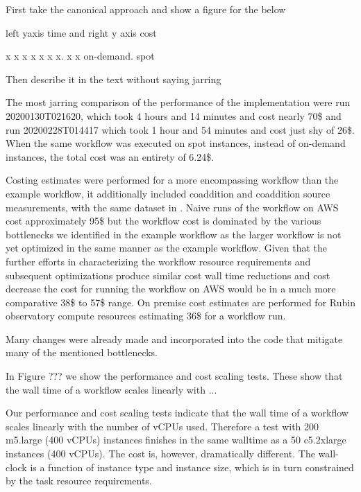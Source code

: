\documentclass[a4paper, 10pt, conference]{ieeeconf}
\begin{document}
First take the canonical approach and show a figure for the below 

left yaxis time and right y axis cost

x            x
x            x x
x x.         x x
on-demand.  spot

Then describe it in the text without saying jarring

 The most jarring comparison of the performance of the implementation were run 20200130T021620, which took 4 hours and 14 minutes and cost nearly 70\$ and run 20200228T014417 which took 1 hour and 54 minutes and cost just shy of 26\$. When the same workflow was executed on spot instances, instead of on-demand instances, the total cost was an entirety of 6.24\$.



Costing estimates were performed for a more encompassing workflow than the example workflow, it additionally included coaddition and coaddition source measurements, with the same dataset in \cite{dmtn137}. Naive runs of the workflow on AWS cost approximately 95\$ but the workflow cost is dominated by the various bottlenecks we identified in the example workflow as the larger workflow is not yet optimized in the same manner as the example workflow. Given that the further efforts in characterizing the workflow resource requirements and subsequent optimizations produce similar cost wall time reductions and cost decrease the cost for running the workflow on AWS would be in a much more comparative 38\$ to 57\$ range. On premise cost estimates are performed for Rubin observatory \cite{dmtn135} compute resources estimating 36\$ for a workflow run. 

Many changes were already made and incorporated into the code that mitigate many of the mentioned bottlenecks. 

In Figure ??? we show the performance and cost scaling tests. These show that the wall time of a workflow scales linearly with ...

Our performance and cost scaling tests indicate that the wall time of a workflow scales linearly with the number of vCPUs used. Therefore a test with 200 m5.large (400 vCPUs) instances finishes in the same walltime as a 50 c5.2xlarge instances (400 vCPUs). 
The cost is, however, dramatically different. The wall-clock  is a function of instance type and instance size, which is in turn constrained by the task resource requirements. 
\end{document}
